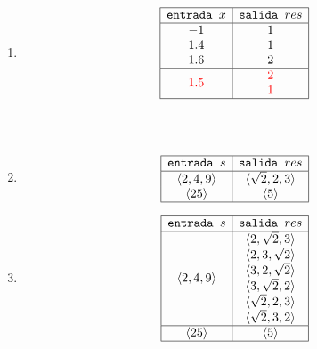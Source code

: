 \documentclass[12pt,a4paper,spanish]{article}
\begin{document}
\begin{enumerate}[label=\alph*)]
	\item
	      \def\salidaLarga{
		      \begin{array}{c}
			      \red{2} \\
			      \red{1}
		      \end{array}
	      }
	      \[
		      \begin{array}{|c|c|}
			      \hline
			      \texttt{entrada }x & \texttt{salida }res \\ \hline
			      -1                 & 1                   \\
			      1.4                & 1                   \\
			      1.6                & 2                   \\ \hline
			      \red{1.5}          & \salidaLarga        \\ \hline
		      \end{array}
	      \]
	      \\
	      \\

	\item
	      \[
		      \begin{array}{|c|c|}
			      \hline
			      \texttt{entrada } s & \texttt{salida } res       \\  \hline
			      \langle2, 4, 9\rangle & \langle\sqrt{2}, 2, 3\rangle \\
			      \langle25\rangle      & \langle5\rangle              \\\hline
		      \end{array}
	      \]

	\item
	      \def\salidaLarga{
		      \begin{array}{c}
			      \secuencia{2, \sqrt{2}, 3} \\
			      \secuencia{2, 3, \sqrt{2}} \\
			      \secuencia{3, 2, \sqrt{2}} \\
			      \secuencia{3, \sqrt{2}, 2} \\
			      \secuencia{\sqrt{2}, 2, 3} \\
			      \secuencia{\sqrt{2},3, 2}  \\
		      \end{array}
	      }
	      \[
		      \begin{array}{|c|c|}
			      \hline
			      \texttt{entrada } s & \texttt{salida } res \\  \hline
			      \secuencia{2, 4, 9} & \salidaLarga         \\ \hline
			      \secuencia{25}      & \secuencia{5}        \\ \hline
		      \end{array}
	      \]


\end{enumerate}
\end{document}
